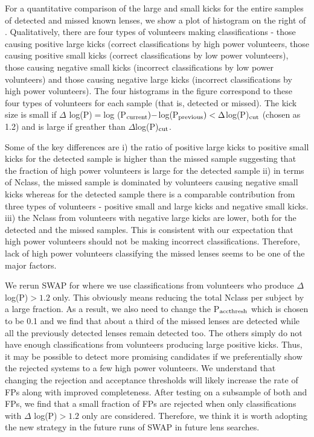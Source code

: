 \documentclass[useAMS,usenatbib,a4paper]{mn2e}
\begin{document}
For a quantitative comparison of the large and small kicks for the
entire samples of detected and missed known lenses, we show a plot of
histogram on the right of . Qualitatively, there are
four types of volunteers making classifications - those causing positive
large kicks (correct classifications by high power volunteers, those
causing positive small kicks (correct classifications by low power
volunteers), those causing negative small kicks (incorrect
classifications by low power volunteers) and those causing negative
large kicks (incorrect classifications by high power volunteers). The
four histograms in the figure correspond to these four types of
volunteers for each sample (that is, detected or missed). The kick size
is small if $\Delta$ log(P)$=$log (P$_{\rm current}) - $log(P$_{\rm
previous}) < \Delta$log(P)$_{\rm cut}$ (chosen as 1.2) and is large
if greather than $\Delta$log(P)$_{\rm cut}$.

Some of the key differences are i) the ratio of positive large kicks to
positive small kicks for the detected sample is higher than the missed
sample suggesting that the fraction of high power volunteers is large
for the detected sample ii) in terms of Nclass, the missed sample is
dominated by volunteers causing negative small kicks whereas for the
detected sample there is a comparable contribution from three types of
volunteers - positive small and large kicks and negative small kicks.
iii) the Nclass from volunteers with negative large kicks are lower, both
for the detected and the missed samples. This is consistent with our
expectation that high power volunteers should not be making incorrect
classifications. Therefore, lack of high power volunteers classifying
the missed lenses seems to be one of the major factors.

We rerun SWAP for \StageOne where we use classifications from volunteers
who produce $\Delta$ log(P)$>1.2$ only. This obviously means reducing
the total Nclass per subject by a large fraction. As a result, we also
need to change the P$_{\rm acc thresh}$ which is chosen to be 0.1 and we
find that about a third of the missed lenses are detected while all the
previously detected lenses remain detected too. The others simply do not
have enough classifications from volunteers producing large positive
kicks. Thus, it may be possible to detect more promising candidates if
we preferentially show the rejected systems to a few high power
volunteers. We understand that changing the rejection and acceptance
thresholds will likely increase the rate of FPs along with improved
completeness. After testing on a subsample of both \StageOne and
\StageOne FPs, we find that a small fraction of FPs are rejected when
only classifications with $\Delta$ log(P)$>1.2$ only are considered.
Therefore, we think it is worth adopting the new strategy in the future
runs of SWAP in future lens searches.
\end{document}
